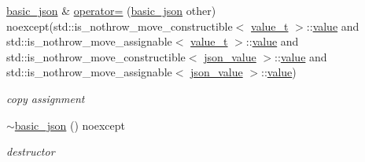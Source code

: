 \begin{DoxyCompactItemize}
\mbox{\hyperlink{classnlohmann_1_1basic__json}{basic\+\_\+json}} \& \mbox{\hyperlink{classnlohmann_1_1basic__json_a849368ca71af3a93d576939d486f61c7}{operator=}} (\mbox{\hyperlink{classnlohmann_1_1basic__json}{basic\+\_\+json}} other) noexcept(std\+::is\+\_\+nothrow\+\_\+move\+\_\+constructible$<$ \mbox{\hyperlink{namespacenlohmann_1_1detail_a1ed8fc6239da25abcaf681d30ace4985}{value\+\_\+t}} $>$\+::\mbox{\hyperlink{classnlohmann_1_1basic__json_adcf8ca5079f5db993820bf50036bf45d}{value}} and std\+::is\+\_\+nothrow\+\_\+move\+\_\+assignable$<$ \mbox{\hyperlink{namespacenlohmann_1_1detail_a1ed8fc6239da25abcaf681d30ace4985}{value\+\_\+t}} $>$\+::\mbox{\hyperlink{classnlohmann_1_1basic__json_adcf8ca5079f5db993820bf50036bf45d}{value}} and std\+::is\+\_\+nothrow\+\_\+move\+\_\+constructible$<$ \mbox{\hyperlink{unionnlohmann_1_1basic__json_1_1json__value}{json\+\_\+value}} $>$\+::\mbox{\hyperlink{classnlohmann_1_1basic__json_adcf8ca5079f5db993820bf50036bf45d}{value}} and std\+::is\+\_\+nothrow\+\_\+move\+\_\+assignable$<$ \mbox{\hyperlink{unionnlohmann_1_1basic__json_1_1json__value}{json\+\_\+value}} $>$\+::\mbox{\hyperlink{classnlohmann_1_1basic__json_adcf8ca5079f5db993820bf50036bf45d}{value}})
\begin{DoxyCompactList}\small\item\em copy assignment \end{DoxyCompactList}\item 
\mbox{\hyperlink{classnlohmann_1_1basic__json_aba01953d5d90e676d504863b8d9fdde5}{$\sim$basic\+\_\+json}} () noexcept
\begin{DoxyCompactList}\small\item\em destructor \end{DoxyCompactList}\end{DoxyCompactItemize}

